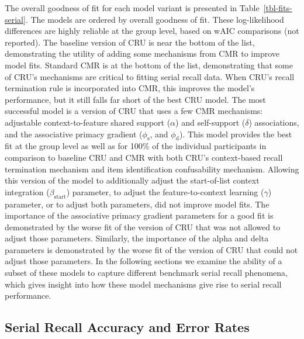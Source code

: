 \documentclass[
  letterpaper,
  11pt,
  english,
  singlespacing,
  headsepline]{MastersDoctoralThesis}
\begin{document}
The overall goodness of fit for each model variant is presented in
Table~\ref{tbl-fits-serial}. The models are ordered by overall goodness
of fit. These log-likelihood differences are highly reliable at the
group level, based on wAIC comparisons (not reported). The baseline
version of CRU is near the bottom of the list, demonstrating the utility
of adding some mechanisms from CMR to improve model fits. Standard CMR
is at the bottom of the list, demonstrating that some of CRU's
mechanisms are critical to fitting serial recall data. When CRU's recall
termination rule is incorporated into CMR, this improves the model's
performance, but it still falls far short of the best CRU model. The
most successful model is a version of CRU that uses a few CMR
mechanisms: adjustable context-to-feature shared support (\(\alpha\))
and self-support (\(\delta\)) associations, and the associative primacy
gradient (\(\phi_\text{s}\), and \(\phi_\text{d}\)). This model provides
the best fit at the group level as well as for 100\% of the individual
participants in comparison to baseline CRU and CMR with both CRU's
context-based recall termination mechanism and item identification
confusability mechanism. Allowing this version of the model to
additionally adjust the start-of-list context integration
(\(\beta_\text{start}\)) parameter, to adjust the feature-to-context
learning (\(\gamma\)) parameter, or to adjust both parameters, did not
improve model fits. The importance of the associative primacy gradient
parameters for a good fit is demonstrated by the worse fit of the
version of CRU that was not allowed to adjust those parameters.
Similarly, the importance of the alpha and delta parameters is
demonstrated by the worse fit of the version of CRU that could not
adjust those parameters. In the following sections we examine the
ability of a subset of these models to capture different benchmark
serial recall phenomena, which gives insight into how these model
mechanisms give rise to serial recall performance.

\subsection{Serial Recall Accuracy and Error
Rates}\label{serial-recall-accuracy-and-error-rates}
\end{document}
